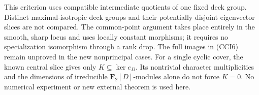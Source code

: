 \begin{remark}
\label{rem:compatible-cyclic-intermediate-scope}
This criterion uses compatible intermediate quotients of one fixed
deck group. Distinct maximal-isotropic deck groups and their
potentially disjoint eigenvector slices are not compared. The
common-point argument takes place entirely in the smooth, sharp
locus and uses locally constant morphisms; it requires no
specialization isomorphism through a rank drop.
The full images in (CCI6) remain unproved in the new nonprincipal
cases. For a single cyclic cover, the known central slice gives
only \(K\subseteq\ker e_D\). Its nontrivial character
multiplicities and the dimensions of irreducible
\(\mathbf F_2[D]\)-modules alone do not force \(K=0\).
No numerical experiment or new external theorem is used here.
\end{remark}
